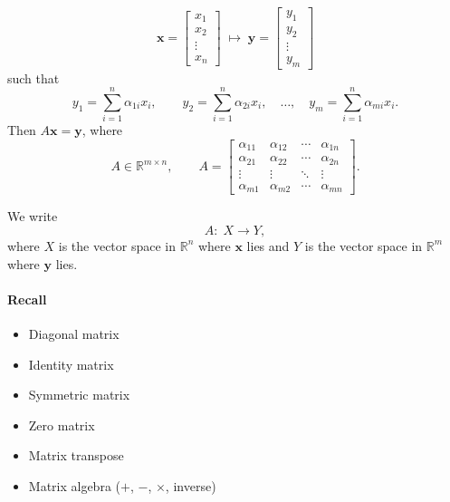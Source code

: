\documentclass{ee102_notes}
\begin{document}
\[
\mathbf{x}=
\begin{bmatrix}
x_1\\ x_2\\ \vdots\\ x_n
\end{bmatrix}
\;\longmapsto\;
\mathbf{y}=
\begin{bmatrix}
y_1\\ y_2\\ \vdots\\ y_m
\end{bmatrix}
\]
such that
\[
y_1=\sum_{i=1}^{n}\alpha_{1i}x_i,\qquad
y_2=\sum_{i=1}^{n}\alpha_{2i}x_i,\quad \ldots,\quad
y_m=\sum_{i=1}^{n}\alpha_{mi}x_i .
\]
Then $A\mathbf{x}=\mathbf{y}$, where
\[
A\in\mathbb{R}^{m\times n}, \qquad
A=
\begin{bmatrix}
\alpha_{11} & \alpha_{12} & \cdots & \alpha_{1n}\\
\alpha_{21} & \alpha_{22} & \cdots & \alpha_{2n}\\
\vdots      & \vdots      & \ddots & \vdots\\
\alpha_{m1} & \alpha_{m2} & \cdots & \alpha_{mn}
\end{bmatrix}.
\]

We write
\[
A:\; X \to Y,
\]
where $X$ is the vector space in $\mathbb{R}^n$ where $\mathbf{x}$ lies and $Y$ is the vector space in $\mathbb{R}^m$ where $\mathbf{y}$ lies.

\paragraph{Recall}
\begin{itemize}
  \item Diagonal matrix
  \item Identity matrix
  \item Symmetric matrix
  \item Zero matrix
  \item Matrix transpose
  \item Matrix algebra ($+$, $-$, $\times$, inverse)
\end{itemize}
\end{document}
